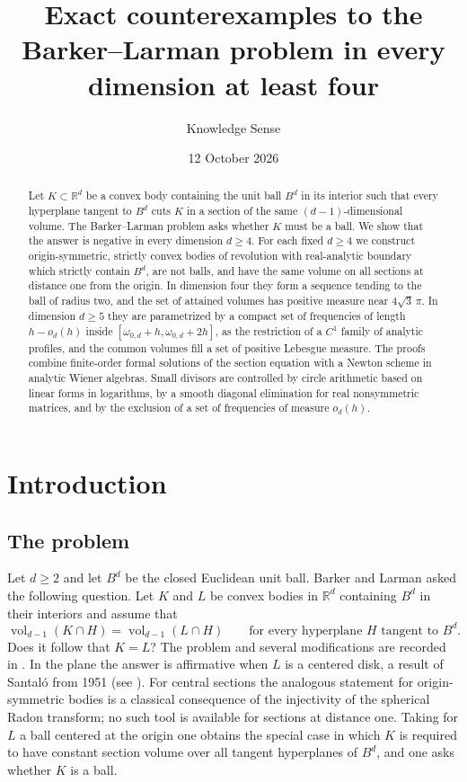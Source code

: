 \documentclass[11pt]{amsart}
\title[Counterexamples to the Barker--Larman problem]{Exact counterexamples to the Barker--Larman problem in every dimension at least four}
\author{Knowledge Sense}
\date{12 October 2026}
\numberwithin{equation}{section}
\theoremstyle{definition}
\theoremstyle{remark}
\newcommand{\R}{\mathbb{R}}
\newcommand{\vol}{\operatorname{vol}}
\begin{document}
\begin{abstract}
Let $K\subset\R^d$ be a convex body containing the unit ball $B^d$ in its interior such that every hyperplane tangent to $B^d$ cuts $K$ in a section of the same $(d-1)$-dimensional volume. The Barker--Larman problem asks whether $K$ must be a ball. We show that the answer is negative in every dimension $d\ge 4$. For each fixed $d\ge4$ we construct origin-symmetric, strictly convex bodies of revolution with real-analytic boundary which strictly contain $B^d$, are not balls, and have the same volume on all sections at distance one from the origin. In dimension four they form a sequence tending to the ball of radius two, and the set of attained volumes has positive measure near $4\sqrt3\,\pi$. In dimension $d\ge5$ they are parametrized by a compact set of frequencies of length $h-o_d(h)$ inside $[\omega_{0,d}+h,\omega_{0,d}+2h]$, as the restriction of a $C^1$ family of analytic profiles, and the common volumes fill a set of positive Lebesgue measure. The proofs combine finite-order formal solutions of the section equation with a Newton scheme in analytic Wiener algebras. Small divisors are controlled by circle arithmetic based on linear forms in logarithms, by a smooth diagonal elimination for real nonsymmetric matrices, and by the exclusion of a set of frequencies of measure $o_d(h)$.
\end{abstract}

\maketitle

\section{Introduction}\label{sec:intro}

\subsection{The problem}
Let $d\ge2$ and let $B^d$ be the closed Euclidean unit ball. Barker and Larman \cite{BL} asked the following question. Let $K$ and $L$ be convex bodies in $\R^d$ containing $B^d$ in their interiors and assume that
\[
\vol_{d-1}(K\cap H)=\vol_{d-1}(L\cap H)\qquad\text{for every hyperplane $H$ tangent to $B^d$.}
\]
Does it follow that $K=L$? The problem and several modifications are recorded in \cite{YZ}. In the plane the answer is affirmative when $L$ is a centered disk, a result of Santal\'o from 1951 (see \cite{HR}). For central sections the analogous statement for origin-symmetric bodies is a classical consequence of the injectivity of the spherical Radon transform; no such tool is available for sections at distance one. Taking for $L$ a ball centered at the origin one obtains the special case in which $K$ is required to have constant section volume over all tangent hyperplanes of $B^d$, and one asks whether $K$ is a ball.
\end{document}
